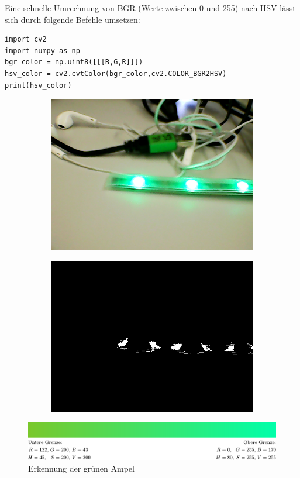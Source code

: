 \documentclass[a4paper, 12pt]{scrartcl}
\begin{document}
Eine schnelle Umrechnung von BGR (Werte zwischen 0 und 255) nach HSV lässt sich durch folgende Befehle umsetzen:

\begin{lstlisting}
import cv2
import numpy as np
bgr_color = np.uint8([[[B,G,R]]])
hsv_color = cv2.cvtColor(bgr_color,cv2.COLOR_BGR2HSV)
print(hsv_color)
\end{lstlisting}

\begin{figure}[H]
	\centering
	\begin{subfigure}{.5\textwidth}
		\centering
		\includegraphics[width=\textwidth]{../testbilder/gruen.png}
	\end{subfigure}%
	\begin{subfigure}{.5\textwidth}
		\centering
		\includegraphics[width=\textwidth]{../testbilder/gruen2.png}
	\end{subfigure}
	\vspace{1ex}
	
	\includegraphics[width=1\textwidth]{../testbilder/Gruen_Bereich.pdf}
	\caption{Erkennung der grünen Ampel}
\end{figure}
\end{document}

